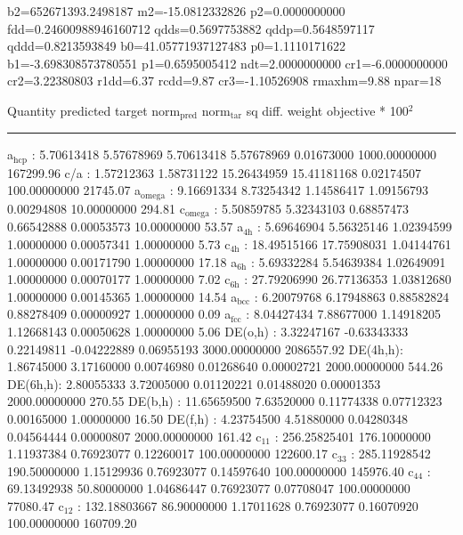 \documentclass[11pt]{article}
\begin{document}
b2=652671393.2498187 m2=-15.0812332826 p2=0.0000000000 fdd=0.24600988946160712 qdds=0.5697753882 qddp=0.5648597117 qddd=0.8213593849 b0=41.05771937127483 p0=1.1110171622 b1=-3.698308573780551 p1=0.6595005412 ndt=2.0000000000 cr1=-6.0000000000 cr2=3.22380803 r1dd=6.37 rcdd=9.87 cr3=-1.10526908 rmaxhm=9.88 npar=18 

Quantity      predicted    target     norm\(_{\text{pred}}\)   norm\(_{\text{tar}}\)    sq diff.      weight    objective * 100\(^{\text{2}}\) 

\noindent\rule{\textwidth}{0.5pt}
a\(_{\text{hcp}}\)   :   5.70613418   5.57678969   5.70613418   5.57678969   0.01673000 1000.00000000    167299.96
c/a     :   1.57212363   1.58731122  15.26434959  15.41181168   0.02174507 100.00000000     21745.07
a\(_{\text{omega}}\) :   9.16691334   8.73254342   1.14586417   1.09156793   0.00294808  10.00000000       294.81
c\(_{\text{omega}}\) :   5.50859785   5.32343103   0.68857473   0.66542888   0.00053573  10.00000000        53.57
a\(_{\text{4h}}\)    :   5.69646904   5.56325146   1.02394599   1.00000000   0.00057341   1.00000000         5.73
c\(_{\text{4h}}\)    :  18.49515166  17.75908031   1.04144761   1.00000000   0.00171790   1.00000000        17.18
a\(_{\text{6h}}\)    :   5.69332284   5.54639384   1.02649091   1.00000000   0.00070177   1.00000000         7.02
c\(_{\text{6h}}\)    :  27.79206990  26.77136353   1.03812680   1.00000000   0.00145365   1.00000000        14.54
a\(_{\text{bcc}}\)   :   6.20079768   6.17948863   0.88582824   0.88278409   0.00000927   1.00000000         0.09
a\(_{\text{fcc}}\)   :   8.04427434   7.88677000   1.14918205   1.12668143   0.00050628   1.00000000         5.06
DE(o,h) :   3.32247167  -0.63343333   0.22149811  -0.04222889   0.06955193 3000.00000000   2086557.92
DE(4h,h):   1.86745000   3.17160000   0.00746980   0.01268640   0.00002721 2000.00000000       544.26
DE(6h,h):   2.80055333   3.72005000   0.01120221   0.01488020   0.00001353 2000.00000000       270.55
DE(b,h) :  11.65659500   7.63520000   0.11774338   0.07712323   0.00165000   1.00000000        16.50
DE(f,h) :   4.23754500   4.51880000   0.04280348   0.04564444   0.00000807 2000.00000000       161.42
c\(_{\text{11}}\)    : 256.25825401 176.10000000   1.11937384   0.76923077   0.12260017 100.00000000    122600.17
c\(_{\text{33}}\)    : 285.11928542 190.50000000   1.15129936   0.76923077   0.14597640 100.00000000    145976.40
c\(_{\text{44}}\)    :  69.13492938  50.80000000   1.04686447   0.76923077   0.07708047 100.00000000     77080.47
c\(_{\text{12}}\)    : 132.18803667  86.90000000   1.17011628   0.76923077   0.16070920 100.00000000    160709.20
\end{document}
